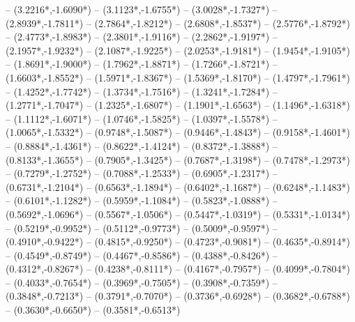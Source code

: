 {	-- ({3.2216*\dx},{-1.6090*\dy})
	-- ({3.1123*\dx},{-1.6755*\dy})
	-- ({3.0028*\dx},{-1.7327*\dy})
	-- ({2.8939*\dx},{-1.7811*\dy})
	-- ({2.7864*\dx},{-1.8212*\dy})
	-- ({2.6808*\dx},{-1.8537*\dy})
	-- ({2.5776*\dx},{-1.8792*\dy})
	-- ({2.4773*\dx},{-1.8983*\dy})
	-- ({2.3801*\dx},{-1.9116*\dy})
	-- ({2.2862*\dx},{-1.9197*\dy})
	-- ({2.1957*\dx},{-1.9232*\dy})
	-- ({2.1087*\dx},{-1.9225*\dy})
	-- ({2.0253*\dx},{-1.9181*\dy})
	-- ({1.9454*\dx},{-1.9105*\dy})
	-- ({1.8691*\dx},{-1.9000*\dy})
	-- ({1.7962*\dx},{-1.8871*\dy})
	-- ({1.7266*\dx},{-1.8721*\dy})
	-- ({1.6603*\dx},{-1.8552*\dy})
	-- ({1.5971*\dx},{-1.8367*\dy})
	-- ({1.5369*\dx},{-1.8170*\dy})
	-- ({1.4797*\dx},{-1.7961*\dy})
	-- ({1.4252*\dx},{-1.7742*\dy})
	-- ({1.3734*\dx},{-1.7516*\dy})
	-- ({1.3241*\dx},{-1.7284*\dy})
	-- ({1.2771*\dx},{-1.7047*\dy})
	-- ({1.2325*\dx},{-1.6807*\dy})
	-- ({1.1901*\dx},{-1.6563*\dy})
	-- ({1.1496*\dx},{-1.6318*\dy})
	-- ({1.1112*\dx},{-1.6071*\dy})
	-- ({1.0746*\dx},{-1.5825*\dy})
	-- ({1.0397*\dx},{-1.5578*\dy})
	-- ({1.0065*\dx},{-1.5332*\dy})
	-- ({0.9748*\dx},{-1.5087*\dy})
	-- ({0.9446*\dx},{-1.4843*\dy})
	-- ({0.9158*\dx},{-1.4601*\dy})
	-- ({0.8884*\dx},{-1.4361*\dy})
	-- ({0.8622*\dx},{-1.4124*\dy})
	-- ({0.8372*\dx},{-1.3888*\dy})
	-- ({0.8133*\dx},{-1.3655*\dy})
	-- ({0.7905*\dx},{-1.3425*\dy})
	-- ({0.7687*\dx},{-1.3198*\dy})
	-- ({0.7478*\dx},{-1.2973*\dy})
	-- ({0.7279*\dx},{-1.2752*\dy})
	-- ({0.7088*\dx},{-1.2533*\dy})
	-- ({0.6905*\dx},{-1.2317*\dy})
	-- ({0.6731*\dx},{-1.2104*\dy})
	-- ({0.6563*\dx},{-1.1894*\dy})
	-- ({0.6402*\dx},{-1.1687*\dy})
	-- ({0.6248*\dx},{-1.1483*\dy})
	-- ({0.6101*\dx},{-1.1282*\dy})
	-- ({0.5959*\dx},{-1.1084*\dy})
	-- ({0.5823*\dx},{-1.0888*\dy})
	-- ({0.5692*\dx},{-1.0696*\dy})
	-- ({0.5567*\dx},{-1.0506*\dy})
	-- ({0.5447*\dx},{-1.0319*\dy})
	-- ({0.5331*\dx},{-1.0134*\dy})
	-- ({0.5219*\dx},{-0.9952*\dy})
	-- ({0.5112*\dx},{-0.9773*\dy})
	-- ({0.5009*\dx},{-0.9597*\dy})
	-- ({0.4910*\dx},{-0.9422*\dy})
	-- ({0.4815*\dx},{-0.9250*\dy})
	-- ({0.4723*\dx},{-0.9081*\dy})
	-- ({0.4635*\dx},{-0.8914*\dy})
	-- ({0.4549*\dx},{-0.8749*\dy})
	-- ({0.4467*\dx},{-0.8586*\dy})
	-- ({0.4388*\dx},{-0.8426*\dy})
	-- ({0.4312*\dx},{-0.8267*\dy})
	-- ({0.4238*\dx},{-0.8111*\dy})
	-- ({0.4167*\dx},{-0.7957*\dy})
	-- ({0.4099*\dx},{-0.7804*\dy})
	-- ({0.4033*\dx},{-0.7654*\dy})
	-- ({0.3969*\dx},{-0.7505*\dy})
	-- ({0.3908*\dx},{-0.7359*\dy})
	-- ({0.3848*\dx},{-0.7213*\dy})
	-- ({0.3791*\dx},{-0.7070*\dy})
	-- ({0.3736*\dx},{-0.6928*\dy})
	-- ({0.3682*\dx},{-0.6788*\dy})
	-- ({0.3630*\dx},{-0.6650*\dy})
	-- ({0.3581*\dx},{-0.6513*\dy})
}
